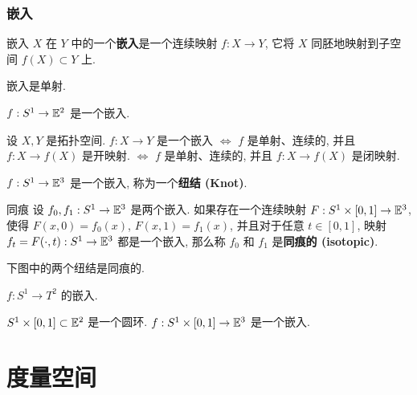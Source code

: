 \subsection{嵌入}

\begin{definition}{嵌入}
    $X$ 在 $Y$ 中的一个\textbf{嵌入}是一个连续映射 $f:X\to Y$, 它将 $X$ 同胚地映射到子空间 $f(X)\subset Y$ 上.
\end{definition}

\begin{remark}
    嵌入是单射.
\end{remark}

\begin{instance}
    $f:S^1\to\mathbb{E}^2$ 是一个嵌入.
\end{instance}

\begin{proposition}
    设 $X,Y$ 是拓扑空间. $f:X\to Y$ 是一个嵌入
    $\Leftrightarrow$ $f$ 是单射、连续的, 并且 $f:X\to f(X)$ 是开映射.
    $\Leftrightarrow$ $f$ 是单射、连续的, 并且 $f:X\to f(X)$ 是闭映射.
\end{proposition}

\begin{instance}
    $f:S^1\to\mathbb{E}^3$ 是一个嵌入, 称为一个\textbf{纽结 (Knot)}.
\end{instance}

\begin{definition}{同痕}
    设 $f_0, f_1: S^1 \to \mathbb{E}^3$ 是两个嵌入. 如果存在一个连续映射 $F:S^1\times[0,1]\to\mathbb{E}^3$, 使得
    $F(x,0)=f_0(x)$, $F(x,1)=f_1(x)$, 并且对于任意 $t\in[0,1]$, 映射 $f_t=F(\cdot,t):S^1\to\mathbb{E}^3$ 都是一个嵌入,
    那么称 $f_0$ 和 $f_1$ 是\textbf{同痕的 (isotopic)}.
\end{definition}

\begin{instance}
    下图中的两个纽结是同痕的.
\end{instance}

\begin{instance}
    $f:S^1\to T^2$ 的嵌入.
\end{instance}

\begin{instance}
    $S^1\times[0,1]\subset \mathbb{E}^2$ 是一个圆环.
    $f:S^1\times[0,1]\to\mathbb{E}^3$ 是一个嵌入.
\end{instance}

\chapter{度量空间}


